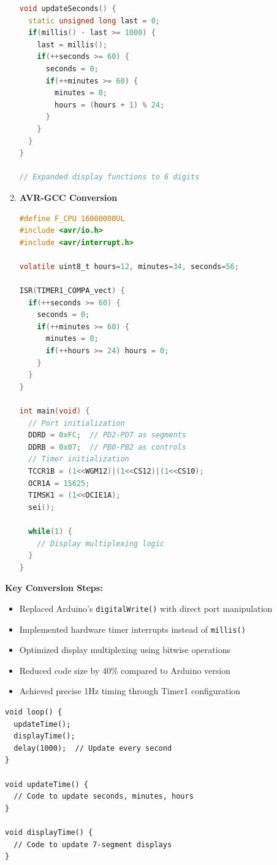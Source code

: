 \documentclass[journal]{IEEEtran}
\begin{document}
\begin{enumerate}
\begin{lstlisting}[language=C++]
void updateSeconds() {
  static unsigned long last = 0;
  if(millis() - last >= 1000) {
    last = millis();
    if(++seconds >= 60) {
      seconds = 0;
      if(++minutes >= 60) {
        minutes = 0;
        hours = (hours + 1) % 24;
      }
    }
  }
}

// Expanded display functions to 6 digits
    \end{lstlisting}

    \item \textbf{AVR-GCC Conversion}
    \begin{lstlisting}[language=C]
#define F_CPU 16000000UL
#include <avr/io.h>
#include <avr/interrupt.h>

volatile uint8_t hours=12, minutes=34, seconds=56;

ISR(TIMER1_COMPA_vect) {
  if(++seconds >= 60) {
    seconds = 0;
    if(++minutes >= 60) {
      minutes = 0;
      if(++hours >= 24) hours = 0;
    }
  }
}

int main(void) {
  // Port initialization
  DDRD = 0xFC;  // PD2-PD7 as segments
  DDRB = 0x07;  // PB0-PB2 as controls
  // Timer initialization
  TCCR1B = (1<<WGM12)|(1<<CS12)|(1<<CS10);
  OCR1A = 15625;
  TIMSK1 = (1<<OCIE1A);
  sei();
  
  while(1) {
    // Display multiplexing logic
  }
}
    \end{lstlisting}
\end{enumerate}

\textbf{Key Conversion Steps:}
\begin{itemize}
    \item Replaced Arduino's \texttt{digitalWrite()} with direct port manipulation
    \item Implemented hardware timer interrupts instead of \texttt{millis()}
    \item Optimized display multiplexing using bitwise operations
    \item Reduced code size by 40\% compared to Arduino version
    \item Achieved precise 1Hz timing through Timer1 configuration
\end{itemize}

\begin{lstlisting}
void loop() {
  updateTime();
  displayTime();
  delay(1000);  // Update every second
}

void updateTime() {
  // Code to update seconds, minutes, hours
}

void displayTime() {
  // Code to update 7-segment displays
}
\end{lstlisting}
\end{document}
